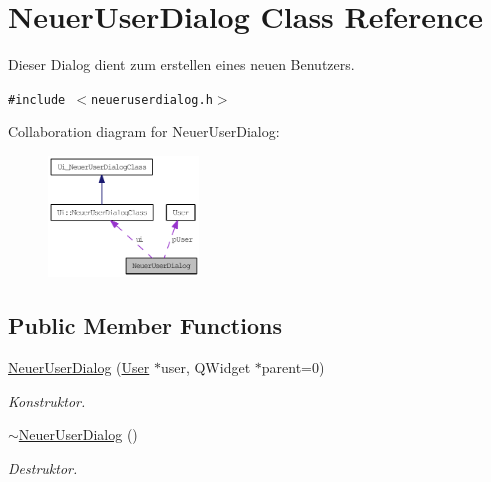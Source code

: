 \hypertarget{class_neuer_user_dialog}{
\section{NeuerUserDialog Class Reference}
\label{class_neuer_user_dialog}
}
Dieser Dialog dient zum erstellen eines neuen Benutzers.  


{\tt \#include $<$neueruserdialog.h$>$}

Collaboration diagram for NeuerUserDialog:\nopagebreak
\begin{figure}[H]
\begin{center}
\leavevmode
\includegraphics[width=113pt]{class_neuer_user_dialog__coll__graph}
\end{center}
\end{figure}
\subsection*{Public Member Functions}
\begin{CompactItemize}
\item 
\hyperlink{class_neuer_user_dialog_6042fa6723528bcfb392d186079eda52}{NeuerUserDialog} (\hyperlink{class_user}{User} $\ast$user, QWidget $\ast$parent=0)
\begin{CompactList}\small\item\em Konstruktor. \item\end{CompactList}\item 
\hyperlink{class_neuer_user_dialog_43abc0928f1c44d630543df0af87b99a}{$\sim$NeuerUserDialog} ()
\begin{CompactList}\small\item\em Destruktor. \item\end{CompactList}\end{CompactItemize}
